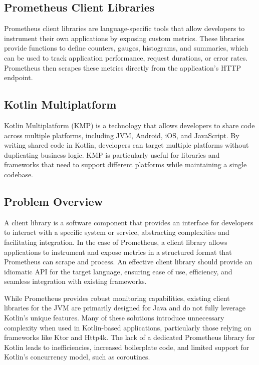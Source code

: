 \documentclass[a4paper,twoside,11pt]{article}
\begin{document}
\subsection{Prometheus Client Libraries}
Prometheus client libraries\cite{clientlibraries:prometheus} are language-specific tools that allow developers to instrument their own applications by exposing custom metrics. These libraries provide functions to define counters, gauges, histograms, and summaries, which can be used to track application performance, request durations, or error rates. Prometheus then scrapes these metrics directly from the application's HTTP endpoint. 

\subsection{Kotlin Multiplatform}
Kotlin Multiplatform\cite{kotlinmultiplatform:jetbrains} (KMP) is a technology that allows developers to share code across multiple platforms, including JVM, Android, iOS, and JavaScript. By writing shared code in Kotlin, developers can target multiple platforms without duplicating business logic. KMP is particularly useful for libraries and frameworks that need to support different platforms while maintaining a single codebase.


\subsection{Problem Overview}
A client library is a software component that provides an interface for developers to interact with a specific system or service, abstracting complexities and facilitating integration. In the case of Prometheus, a client library allows applications to instrument and expose metrics in a structured format that Prometheus can scrape and process. An effective client library should provide an idiomatic API for the target language, ensuring ease of use, efficiency, and seamless integration with existing frameworks.

While Prometheus provides robust monitoring capabilities, existing client libraries for the JVM are primarily designed for Java and do not fully leverage Kotlin’s unique features. Many of these solutions introduce unnecessary complexity when used in Kotlin-based applications, particularly those relying on frameworks like Ktor and Http4k.
The lack of a dedicated Prometheus library for Kotlin leads to inefficiencies, increased boilerplate code, and limited support for Kotlin's concurrency model, such as coroutines. 
\end{document}
